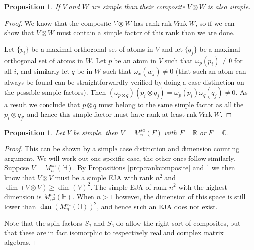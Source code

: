 \documentclass[b5paper,onecolumn,12pt,accepted=2019-05-03, issue=1, volume=1, shorttitle=papers/compositionality-1-1]{compositionalityarticle}
\newcounter{counter}
\numberwithin{counter}{section}
\newtheorem{proposition}[counter]{Proposition}
\newcommand{\rnk}{\text{rnk}\xspace}
\newcommand{\R}{\mathbb{R}}
\newcommand{\C}{\mathbb{C}}
\begin{document}
\begin{proposition}\label{prop:simplecomposite}
    If $V$ and $W$ are simple than their composite $V\otimes W$ is also simple.
\end{proposition}
\begin{proof}
    We know that the composite $V\otimes W$ has rank $\rnk~V \rnk~W$, so if we can show that $V\otimes W$ must contain a simple factor of this rank than we are done.

    Let $\{p_i\}$ be a maximal orthogonal set of atoms in $V$ and let $\{q_j\}$ be a maximal orthogonal set of atoms in $W$. Let $p$ be an atom in $V$ such that $\omega_p(p_i) \neq 0$ for all $i$, and similarly let $q$ be in $W$ such that $\omega_w(w_j) \neq 0$ (that such an atom can always be found can be straightforwardly verified by doing a case distinction on the possible simple factors). Then $(\omega_{p\otimes q})(p_i\otimes q_j) = \omega_p(p_i)\omega_q(q_j) \neq 0$. As a result we conclude that $p\otimes q$ must belong to the same simple factor as all the $p_i\otimes q_j$, and hence this simple factor must have rank at least $\rnk~V \rnk~W$.
\end{proof}

\begin{proposition}\label{prop:simpleEJAcomplexreal}
    Let $V$ be simple, then $V=M_n^{sa}(F)$ with $F=\R$ or $F=\C$.
\end{proposition}
\begin{proof}
    This can be shown by a simple case distinction and dimension counting argument. We will work out one specific case, the other ones follow similarly. Suppose $V=M_n^{sa}(\mathbb{H})$. By Propositions \ref{prop:rankcomposite} and \ref{prop:simplecomposite} we then know that $V\otimes V$ must be a simple EJA with rank $n^2$ and $\dim(V\otimes V)\geq \dim(V)^2$. The simple EJA of rank $n^2$ with the highest dimension is $M_{n^2}^{sa}(\mathbb{H})$. When $n>1$ however, the dimension of this space is still lower than $\dim(M_n^{sa}(\mathbb{H}))^2$, and hence such an EJA does not exist.

    Note that the spin-factors $S_2$ and $S_3$ do allow the right sort of composites, but that these are in fact isomorphic to respectively real and complex matrix algebras.
\end{proof}
\end{document}
